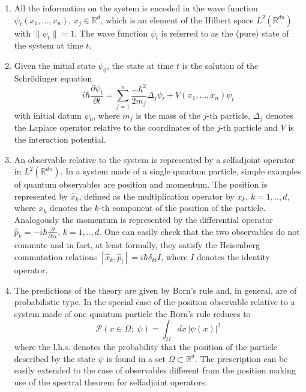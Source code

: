 \documentclass[12pt,reqno]{amsart}
\newcommand{\erre}{\mathbb{R}}
\newcommand{\f}{\frac}
\newcommand{\be}{\begin{equation}}
\newcommand{\ee}{\end{equation}}
\numberwithin{equation}{section}
\begin{document}
\begin{enumerate}[(1)]

\item All the information on the system is encoded in the wave function $\psi_t (x_1, \ldots ,x_n)$, $x_j \in \erre^d$,  which is an element of the Hilbert space $L^2(\erre^{dn})$ with $\|\psi_t\|=1$. The wave function $\psi_t$ is referred to as the (pure) state of the system at time $t$.


\item Given the initial state $\psi_0$, the state at time $t$ is the solution of the Schr\"{o}dinger equation 
\be
i \hbar \f{\partial \psi_t}{\partial t}= \sum_{j=1}^{n} \f{- \hbar^2}{2m_j} \Delta_j \psi_t + V(x_1, \ldots,x_n) \psi_t
\ee
with initial datum $\psi_0$, where $m_j$ is the mass of the $j$-th particle, $\Delta_j$ denotes the Laplace operator relative to the coordinates of the $j$-th particle and $V$ is the interaction potential.

\item  An observable relative to the system is represented by a selfadjoint operator in $L^2(\erre^{dn})$.   In a system made of a single quantum particle, simple examples of quantum observables are  position and  momentum.  The position  is represented by $\hat{x}_{k}$, defined as the multiplication operator by $x_{k}$, $k=1,..,d$, where $x_{k}$ denotes the $k$-th component of the position of the particle.  Analogously  the momentum  is represented by the differential operator $\hat{p}_{k}=-i\hbar \f{\partial}{\partial x_{k}}$, $k=1,..,d$. One can easily check that the two observables do not commute and in fact, at least  formally, they satisfy the Heisenberg commutation relations $[\hat{x}_{k}, \hat{p}_l ] = i \hbar \delta_{k l} I$, where $I$ denotes the identity operator. 

\item The predictions of the theory are given by  Born's rule and, in general, are of probabilistic type. 
In the special case of the position observable relative to a system made of one quantum particle  the Born's rule reduces to
\be\label{br}
{\mathcal P}(x \in \Omega; \; \psi)= \int_{\Omega} \!dx \, |\psi (x)|^2
\ee
where the l.h.s. denotes the probability that the position of the  particle described by the state $\psi$ is found in a  set $\Omega \subset \erre^d$.  
The prescription can be easily extended to the case of  observables different from the position making use of the spectral theorem for selfadjoint operators.

\end{enumerate}
\end{document}
